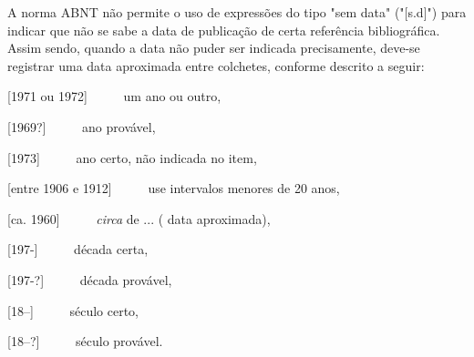 \begin{apendicesenv}
A norma ABNT não permite o uso de expressões do tipo "sem data"{} ("[s.d]") para
indicar que não se sabe a data de publicação de certa referência bibliográfica.
Assim sendo, quando a data não puder ser indicada precisamente, deve-se
registrar uma data aproximada entre colchetes, conforme descrito a seguir:

[1971 ou 1972] \ \ \ \ \ um ano ou outro,

[1969?] \ \ \ \ \ ano provável,

[1973] \ \ \ \ \ ano certo, não indicada no item,

[entre 1906 e 1912] \ \ \ \ \ use intervalos menores de 20 anos,

[ca. 1960] \ \ \ \ \ \textit{circa} de ... ( data aproximada),

[197-] \ \ \ \ \ década certa,

[197-?] \ \ \ \ \ década provável,

[18--] \ \ \ \ \ século certo,

[18--?] \ \ \ \ \ século provável.

\end{apendicesenv}
